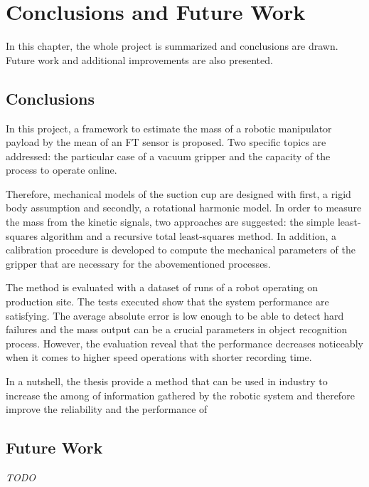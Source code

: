 \documentclass[/home/francois/latex/report/main.tex]{subfiles}
\begin{document}
\chapter{Conclusions and Future Work}
\label{chapter:conclusions}

In this chapter, the whole project is summarized and conclusions are drawn. Future work and additional improvements are also presented.

\section{Conclusions}

In this project, a framework to estimate the mass of a robotic manipulator payload by the mean of an \ac{FT} sensor is proposed. Two specific topics are addressed: the particular case of a vacuum gripper and the capacity of the process to operate online.

Therefore, mechanical models of the suction cup are designed with first, a rigid body assumption and secondly, a rotational harmonic model. In order to measure the mass from the kinetic signals, two approaches are suggested: the simple least-squares algorithm and a recursive total least-squares method. In addition, a calibration procedure is developed to compute the mechanical parameters of the gripper that are necessary for the abovementioned processes.

The method is evaluated with a dataset of runs of a robot operating on production site. The tests executed show that the system performance are satisfying. The average absolute error is low enough to be able to detect hard failures and the mass output can be a crucial parameters in object recognition process. However, the evaluation reveal that the performance decreases noticeably when it comes to higher speed operations with shorter recording time.

In a nutshell, the thesis provide a method that can be used in industry to increase the among of information gathered by the robotic system and therefore improve the reliability and the performance of

\section{Future Work}

\textit{TODO}
\end{document}
